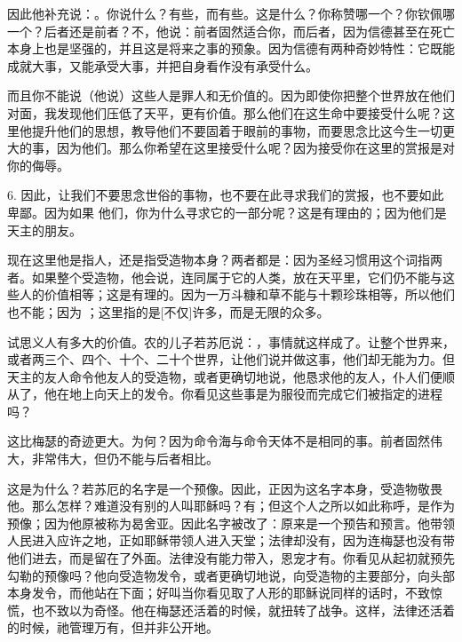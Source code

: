 因此他补充说：。你说什么？有些，而有些。这是什么？你称赞哪一个？你钦佩哪一个？后者还是前者？不，他说：前者固然适合你，而后者，因为信德甚至在死亡本身上也是坚强的，并且这是将来之事的预象。因为信德有两种奇妙特性：它既能成就大事，又能承受大事，并把自身看作没有承受什么。\par

而且你不能说（他说）这些人是罪人和无价值的。因为即使你把整个世界放在他们对面，我发现他们压低了天平，更有价值。那么他们在这生命中要接受什么呢？这里他提升他们的思想，教导他们不要固着于眼前的事物，而要思念比这今生一切更大的事，因为他们。那么你希望在这里接受什么呢？因为接受你在这里的赏报是对你的侮辱。\par

6. 因此，让我们不要思念世俗的事物，也不要在此寻求我们的赏报，也不要如此卑鄙。因为如果 他们，你为什么寻求它的一部分呢？这是有理由的；因为他们是天主的朋友。\par

现在这里他是指人，还是指受造物本身？两者都是：因为圣经习惯用这个词指两者。如果整个受造物，他会说，连同属于它的人类，放在天平里，它们仍不能与这些人的价值相等；这是有理的。因为一万斗糠和草不能与十颗珍珠相等，所以他们也不能；因为 ；这里指的是[不仅]许多，而是无限的众多。\par

试思义人有多大的价值。农的儿子若苏厄说：，事情就这样成了。让整个世界来，或者两三个、四个、十个、二十个世界，让他们说并做这事，他们却无能为力。但天主的友人命令他友人的受造物，或者更确切地说，他恳求他的友人，仆人们便顺从了，他在地上向天上的发令。你看见这些事是为服役而完成它们被指定的进程吗？\par

这比梅瑟的奇迹更大。为何？因为命令海与命令天体不是相同的事。前者固然伟大，非常伟大，但仍不能与后者相比。\par

这是为什么？若苏厄的名字是一个预像。因此，正因为这名字本身，受造物敬畏他。那么怎样？难道没有别的人叫耶稣吗？有；但这个人之所以如此称呼，是作为预像；因为他原被称为曷舍亚。因此名字被改了：原来是一个预告和预言。他带领人民进入应许之地，正如耶稣带领人进入天堂；法律却没有，因为连梅瑟也没有带他们进去，而是留在了外面。法律没有能力带入，恩宠才有。你看见从起初就预先勾勒的预像吗？他向受造物发令，或者更确切地说，向受造物的主要部分，向头部本身发令，而他站在下面；好叫当你看见取了人形的耶稣说同样的话时，不致惊慌，也不致以为奇怪。他在梅瑟还活着的时候，就扭转了战争。这样，法律还活着的时候，祂管理万有，但并非公开地。\par

